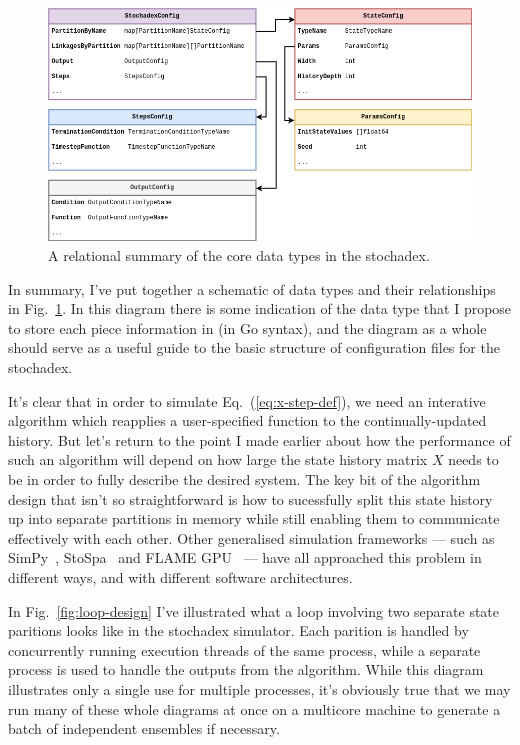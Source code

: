 \documentclass{book}
\begin{document}
\begin{figure}[h]
\centering
\includegraphics[width=15cm]{images/stochadex-data-types.drawio.png}
\caption{A relational summary of the core data types in the stochadex.}
\label{fig:data-types-design}
\end{figure}

In summary, I've put together a schematic of data types and their relationships in Fig.~\ref{fig:data-types-design}. In this diagram there is some indication of the data type that I propose to store each piece information in (in Go syntax), and the diagram as a whole should serve as a useful guide to the basic structure of configuration files for the stochadex.

It's clear that in order to simulate Eq.~(\ref{eq:x-step-def}), we need an interative algorithm which reapplies a user-specified function to the continually-updated history. But let's return to the point I made earlier about how the performance of such an algorithm will depend on how large the state history matrix $X$ needs to be in order to fully describe the desired system. The key bit of the algorithm design that isn't so straightforward is how to sucessfully split this state history up into separate partitions in memory while still enabling them to communicate effectively with each other. Other generalised simulation frameworks --- such as SimPy~\cite{simpy}, StoSpa~\cite{stospa} and FLAME GPU~\cite{flamegpu} --- have all approached this problem in different ways, and with different software architectures.

In Fig.~\ref{fig:loop-design} I've illustrated what a loop involving two separate state paritions looks like in the stochadex simulator. Each parition is handled by concurrently running execution threads of the same process, while a separate process is used to handle the outputs from the algorithm. While this diagram illustrates only a single use for multiple processes, it's obviously true that we may run many of these whole diagrams at once on a multicore machine to generate a batch of independent ensembles if necessary.
\end{document}
